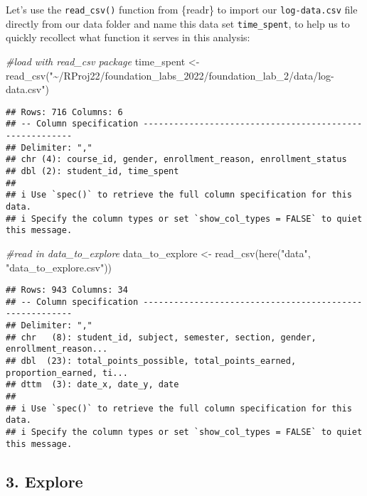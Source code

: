 \documentclass[
]{article}
\newenvironment{Shaded}{\begin{snugshade}}{\end{snugshade}}
\newcommand{\CommentTok}[1]{\textcolor[rgb]{0.56,0.35,0.01}{\textit{#1}}}
\newcommand{\FunctionTok}[1]{\textcolor[rgb]{0.00,0.00,0.00}{#1}}
\newcommand{\NormalTok}[1]{#1}
\newcommand{\OtherTok}[1]{\textcolor[rgb]{0.56,0.35,0.01}{#1}}
\newcommand{\StringTok}[1]{\textcolor[rgb]{0.31,0.60,0.02}{#1}}
\begin{document}
Let's use the \texttt{read\_csv()} function from \{readr\} to import our
\texttt{log-data.csv} file directly from our data folder and name this
data set \texttt{time\_spent}, to help us to quickly recollect what
function it serves in this analysis:

\begin{Shaded}
\begin{Highlighting}[]
\CommentTok{\#load with read\_csv package}
\NormalTok{time\_spent }\OtherTok{\textless{}{-}} \FunctionTok{read\_csv}\NormalTok{(}\StringTok{"\textasciitilde{}/RProj22/foundation\_labs\_2022/foundation\_lab\_2/data/log{-}data.csv"}\NormalTok{)}
\end{Highlighting}
\end{Shaded}

\begin{verbatim}
## Rows: 716 Columns: 6
## -- Column specification --------------------------------------------------------
## Delimiter: ","
## chr (4): course_id, gender, enrollment_reason, enrollment_status
## dbl (2): student_id, time_spent
## 
## i Use `spec()` to retrieve the full column specification for this data.
## i Specify the column types or set `show_col_types = FALSE` to quiet this message.
\end{verbatim}

\begin{Shaded}
\begin{Highlighting}[]
\CommentTok{\#read in data\_to\_explore}
\NormalTok{data\_to\_explore }\OtherTok{\textless{}{-}} \FunctionTok{read\_csv}\NormalTok{(}\FunctionTok{here}\NormalTok{(}\StringTok{"data"}\NormalTok{, }\StringTok{"data\_to\_explore.csv"}\NormalTok{))}
\end{Highlighting}
\end{Shaded}

\begin{verbatim}
## Rows: 943 Columns: 34
## -- Column specification --------------------------------------------------------
## Delimiter: ","
## chr   (8): student_id, subject, semester, section, gender, enrollment_reason...
## dbl  (23): total_points_possible, total_points_earned, proportion_earned, ti...
## dttm  (3): date_x, date_y, date
## 
## i Use `spec()` to retrieve the full column specification for this data.
## i Specify the column types or set `show_col_types = FALSE` to quiet this message.
\end{verbatim}

\hypertarget{explore}{%
\subsection{3. Explore}\label{explore}}
\end{document}
